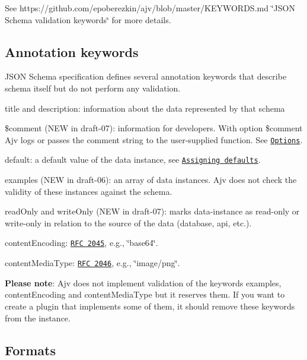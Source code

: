 See https\+://github.com/epoberezkin/ajv/blob/master/\+K\+E\+Y\+W\+O\+R\+D\+S.\+md \char`\"{}\+J\+S\+O\+N Schema validation keywords\char`\"{} for more details.

\subsection*{Annotation keywords}

J\+S\+ON Schema specification defines several annotation keywords that describe schema itself but do not perform any validation.


\begin{DoxyItemize}
\item {\ttfamily title} and {\ttfamily description}\+: information about the data represented by that schema
\item {\ttfamily \$comment} (N\+EW in draft-\/07)\+: information for developers. With option {\ttfamily \$comment} Ajv logs or passes the comment string to the user-\/supplied function. See \href{#options}{\tt Options}.
\item {\ttfamily default}\+: a default value of the data instance, see \href{#assigning-defaults}{\tt Assigning defaults}.
\item {\ttfamily examples} (N\+EW in draft-\/06)\+: an array of data instances. Ajv does not check the validity of these instances against the schema.
\item {\ttfamily read\+Only} and {\ttfamily write\+Only} (N\+EW in draft-\/07)\+: marks data-\/instance as read-\/only or write-\/only in relation to the source of the data (database, api, etc.).
\item {\ttfamily content\+Encoding}\+: \href{https://tools.ietf.org/html/rfc2045#section-6.1}{\tt R\+FC 2045}, e.\+g., \char`\"{}base64\char`\"{}.
\item {\ttfamily content\+Media\+Type}\+: \href{https://tools.ietf.org/html/rfc2046}{\tt R\+FC 2046}, e.\+g., \char`\"{}image/png\char`\"{}.
\end{DoxyItemize}

{\bfseries Please note}\+: Ajv does not implement validation of the keywords {\ttfamily examples}, {\ttfamily content\+Encoding} and {\ttfamily content\+Media\+Type} but it reserves them. If you want to create a plugin that implements some of them, it should remove these keywords from the instance.

\subsection*{Formats}

